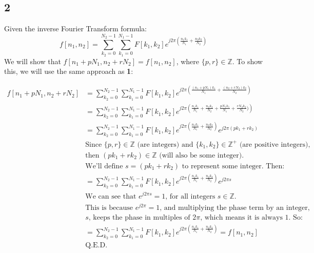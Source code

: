 \documentclass{article}
\begin{document}
\subsection*{2}
Given the inverse Fourier Transform formula:
\[
    f[n_1, n_2] = \sum_{k_2 = 0}^{N_2 - 1} \sum_{k_1 = 0}^{N_1 - 1} F[k_1, k_2] e^{j 2\pi \left(\frac{n_1 k_1}{N_1} + \frac{n_2 k_2}{N_2}\right)}
\]
We will show that $f[n_1 + pN_1, n_2 + rN_2] = f[n_1, n_2]$, where $\{p,r\} \in \mathbb{Z}$. To show this, we will use
the same approach as \textbf{1}:

\begin{align*}
    f[n_1 + pN_1, n_2 + rN_2] &= \sum_{k_2 = 0}^{N_2 - 1} \sum_{k_1 = 0}^{N_1 - 1} F[k_1, k_2]
    e^{j 2\pi \left(\frac{(n_1 + pN_1) k_1}{N_1} + \frac{(n_2 + rN_2) k_2}{N_2}\right)} \\
    &= \sum_{k_2 = 0}^{N_2 - 1} \sum_{k_1 = 0}^{N_1 - 1} F[k_1, k_2]
    e^{j 2\pi \left(\frac{n_1 k_1}{N_1} + \frac{n_2 k_2}{N_2} + \frac{pN_1 k_1}{N_1} + \frac{rN_2 k_2}{N_2})\right)} \\
    &= \sum_{k_2 = 0}^{N_2 - 1} \sum_{k_1 = 0}^{N_1 - 1} F[k_1, k_2]
    e^{j 2\pi \left(\frac{n_1 k_1}{N_1} + \frac{n_2 k_2}{N_2}\right)} e^{j 2\pi(pk_1 + rk_2)} \\
    &\textrm{Since $\{p,r\} \in \mathbb{Z}$ (are integers) and $\{k_{1}, k_{2}\} \in \mathbb{Z}^{+}$ (are positive integers),} \\
    &\textrm{then $\left(pk_{1} + rk_{2}\right) \in \mathbb{Z}$ (will also be some integer). } \\
    &\textrm{We'll define $s = \left(pk_{1} + rk_{2}\right)$ to represent some integer. Then: } \\
    &= \sum_{k_2 = 0}^{N_2 - 1} \sum_{k_1 = 0}^{N_1 - 1} F[k_1, k_2]
    e^{j 2\pi \left(\frac{n_1 k_1}{N_1} + \frac{n_2 k_2}{N_2}\right)} e^{j 2\pi s} \\
    &\textrm{We can see that $e^{j 2\pi s} = 1$, for all integers $s \in \mathbb{Z}$.} \\
    &\textrm{This is because $e^{j 2\pi} = 1$, and multiplying the phase term by an integer,} \\
    &\textrm{$s$, keeps the phase in multiples of $2\pi$, which means it is always 1. So:} \\
    &= \sum_{k_2 = 0}^{N_2 - 1} \sum_{k_1 = 0}^{N_1 - 1} F[k_1, k_2]
    e^{j 2\pi \left(\frac{n_1 k_1}{N_1} + \frac{n_2 k_2}{N_2}\right)} = f[n_1, n_2] \\
    &\textrm{Q.E.D.}
\end{align*}
\end{document}
